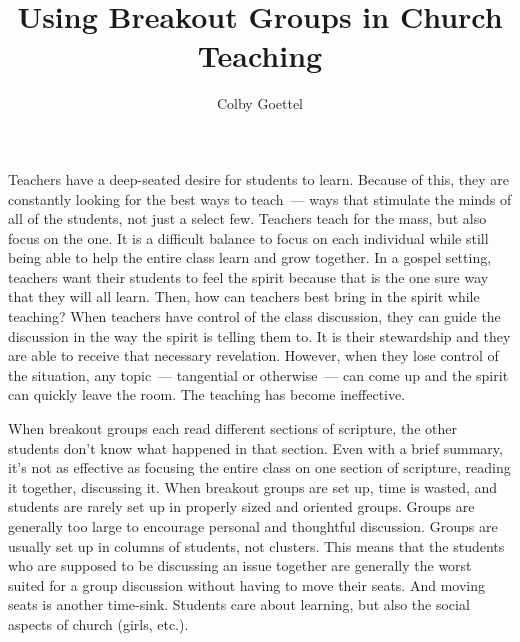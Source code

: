 \documentclass[12pt]{article}
\title{Using Breakout Groups in Church Teaching}
\author{Colby Goettel}
\begin{document}
\maketitle



Teachers have a deep-seated desire for students to learn. Because of this, they are constantly looking for the best ways to teach~--- ways that stimulate the minds of all of the students, not just a select few. Teachers teach for the mass, but also focus on the one. It is a difficult balance to focus on each individual while still being able to help the entire class learn and grow together. In a gospel setting, teachers want their students to feel the spirit because that is the one sure way that they will all learn. Then, how can teachers best bring in the spirit while teaching? When teachers have control of the class discussion, they can guide the discussion in the way the spirit is telling them to. It is their stewardship and they are able to receive that necessary revelation. However, when they lose control of the situation, any topic~--- tangential or otherwise~--- can come up and the spirit can quickly leave the room. The teaching has become ineffective.

When breakout groups each read different sections of scripture, the other students don't know what happened in that section. Even with a brief summary, it's not as effective as focusing the entire class on one section of scripture, reading it together, discussing it. When breakout groups are set up, time is wasted, and students are rarely set up in properly sized and oriented groups. Groups are generally too large to encourage personal and thoughtful discussion. Groups are usually set up in columns of students, not clusters. This means that the students who are supposed to be discussing an issue together are generally the worst suited for a group discussion without having to move their seats. And moving seats is another time-sink. Students care about learning, but also the social aspects of church (girls, etc.).
\end{document}
